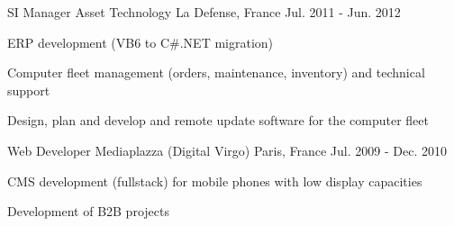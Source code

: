 \begin{cventries}
  \cventry
    {SI Manager} %
    {Asset Technology} %
    {La Defense, France} %
    {Jul. 2011 - Jun. 2012} %
    {
      \begin{cvitems} %
        \item {ERP development (VB6 to C\#.NET migration)}
        \item {Computer fleet management (orders, maintenance, inventory) and technical support}
        \item {Design, plan and develop and remote update software for the computer fleet}
      \end{cvitems}
    }

  \cventry
    {Web Developer} %
    {Mediaplazza (Digital Virgo)} %
    {Paris, France} %
    {Jul. 2009 - Dec. 2010} %
    {
      \begin{cvitems} %
        \item {CMS development (fullstack) for mobile phones with low display capacities}
        \item {Development of B2B projects}
      \end{cvitems}
    }

\end{cventries}

